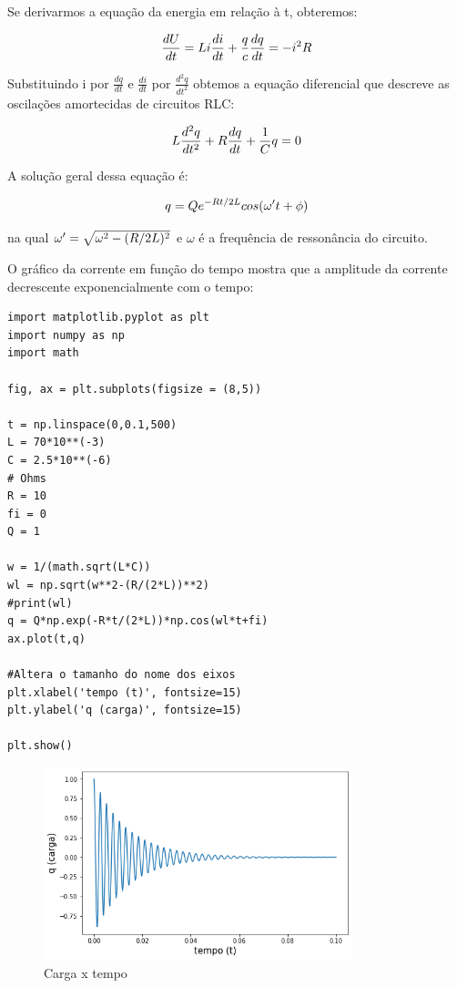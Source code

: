 Se derivarmos a equação da energia em relação à t, obteremos:

\[\large \frac{dU}{dt} = Li\frac{di}{dt} + \frac{q}{c}\frac{dq}{dt} = -i^2R\]

Substituindo i por $\frac{dq}{dt}$ e $\frac{di}{dt}$ por $\frac{d^2q}{dt^2}$ obtemos a equação diferencial que descreve as oscilações amortecidas de circuitos RLC:

\[\large L\frac{d^2q}{dt^2}+R\frac{dq}{dt}+\frac{1}{C}q = 0\]

A solução geral dessa equação é:

\[\large q = Qe^{-Rt/2L}cos(\omega't + \phi)\]

na qual $\large \omega' = \sqrt{\omega^2-(R/2L)^2}$ e $\omega$ é a frequência de ressonância do circuito.

O gráfico da corrente em função do tempo mostra que a amplitude da corrente decrescente exponencialmente com o tempo:

\begin{verbatim}
import matplotlib.pyplot as plt
import numpy as np
import math

fig, ax = plt.subplots(figsize = (8,5))

t = np.linspace(0,0.1,500)
L = 70*10**(-3)
C = 2.5*10**(-6)
# Ohms
R = 10
fi = 0
Q = 1

w = 1/(math.sqrt(L*C))
wl = np.sqrt(w**2-(R/(2*L))**2)
#print(wl)
q = Q*np.exp(-R*t/(2*L))*np.cos(wl*t+fi)
ax.plot(t,q)

#Altera o tamanho do nome dos eixos
plt.xlabel('tempo (t)', fontsize=15) 
plt.ylabel('q (carga)', fontsize=15)

plt.show()
\end{verbatim}

\begin{figure}[H]
	\centering
	\includegraphics[width=0.8\textwidth]{./Imagens/RLC/rlc2.png} 
	\caption{Carga x tempo}
	\label{fig:RLC2}
\end{figure}

